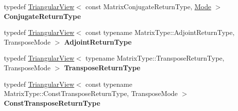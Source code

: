 \begin{DoxyCompactItemize}
\item 
\mbox{\label{class_eigen_1_1_triangular_view_a831d35f0968b567f078c94125dc5b655}} 
typedef \mbox{\hyperlink{class_eigen_1_1_triangular_view}{Triangular\+View}}$<$ const Matrix\+Conjugate\+Return\+Type, \mbox{\hyperlink{struct_mode}{Mode}} $>$ {\bfseries Conjugate\+Return\+Type}
\item 
\mbox{\label{class_eigen_1_1_triangular_view_a369f946f28f2e685276613cfe1b7c378}} 
typedef \mbox{\hyperlink{class_eigen_1_1_triangular_view}{Triangular\+View}}$<$ const typename Matrix\+Type\+::\+Adjoint\+Return\+Type, Transpose\+Mode $>$ {\bfseries Adjoint\+Return\+Type}
\item 
\mbox{\label{class_eigen_1_1_triangular_view_a767876a3c87df914f373159d079f48f7}} 
typedef \mbox{\hyperlink{class_eigen_1_1_triangular_view}{Triangular\+View}}$<$ typename Matrix\+Type\+::\+Transpose\+Return\+Type, Transpose\+Mode $>$ {\bfseries Transpose\+Return\+Type}
\item 
\mbox{\label{class_eigen_1_1_triangular_view_a5f825f07829d0c49f46f28ba07a75f47}} 
typedef \mbox{\hyperlink{class_eigen_1_1_triangular_view}{Triangular\+View}}$<$ const typename Matrix\+Type\+::\+Const\+Transpose\+Return\+Type, Transpose\+Mode $>$ {\bfseries Const\+Transpose\+Return\+Type}
\end{DoxyCompactItemize}
